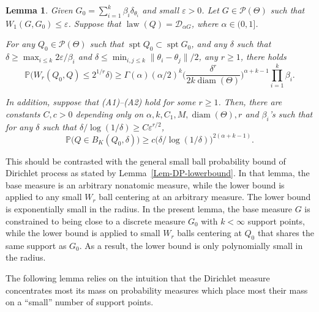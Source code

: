 \documentclass[MSNbibl,number,citesort]{arxbj}
\newtheorem{lemma}{Lemma}[section]
\newcommand{\Pcal}{\mathscr{P}}
\newcommand{\Prob}{\mathbb{P}}
\newcommand{\supp}{\operatorname{spt}}
\newcommand{\DP}{\mathscr{D}}
\newcommand{\law}{\operatorname{law}}
\newcommand{\Wr}{W_r}
\begin{document}
%
\begin{lemma}
\label{Lem-DP-concent}
Given $G_0 = \sum_{i=1}^{k}\beta_i \delta_{\theta_{i}}$ and small
$\varepsilon> 0$.
Let $G \in\Pcal(\Theta)$ such that $W_1(G,G_0) \leq\varepsilon$.
Suppose that $\law(Q) = \DP_{\alpha G}$, where $\alpha\in(0,1]$.
%
\begin{longlist}[(a)]
%
\item[(a)] For any $Q_0 \in\Pcal(\Theta)$ such that $\supp Q_0
\subset\supp G_0$,
and any $\delta$ such that $\delta\geq\max_{i\leq k} 2\varepsilon
/\beta
_i$ and
$\delta\leq\min_{i,j\leq k} \|\theta_i-\theta_j\|/2$, any $r\geq1$,
there holds
%
\[
\Prob \bigl(\Wr(Q_0,Q) \leq2^{1/r}\delta \bigr) \geq\Gamma(
\alpha) (\alpha/2)^k \biggl(\frac{\delta^r}{2k \operatorname
{diam}(\Theta)} \biggr)^{\alpha+ k-1}
\prod_{i=1}^{k}\beta_i.
\]

\item[(b)] In addition, suppose that \textup{(A1)--(A2)} hold for some $r \geq1$.
Then, there are constants $C, c>0$ depending only on $\alpha, k, C_1,
M, \operatorname{diam}(\Theta), r$
and $\beta_i$'s such that
for any $\delta$ such that $\delta/\log(1/\delta) \geq C\varepsilon^{r/2}$,
%
\[
\Prob \bigl(Q \in B_K(Q_0, \delta) \bigr) \geq c
\bigl( \delta/\log(1/\delta) \bigr)^{2(\alpha+k-1)}.
\]
%
\end{longlist}
%
\end{lemma}

This should be contrasted with the general small ball probability bound
of Dirichlet process as stated by Lemma~\ref{Lem-DP-lowerbound}. In that
lemma, the base measure is an arbitrary nonatomic measure, while the lower
bound is applied to any small $\Wr$ ball centering at an arbitrary measure.
The lower bound is exponentially small in the radius.
In the present lemma, the base measure $G$ is constrained
to being close to a discrete measure $G_0$ with $k <\infty$ support
points, while
the lower bound is applied to small $\Wr$ balls centering at $Q_0$
that shares
the same support as $G_0$. As a result, the lower bound is only
polynomially small
in the radius.

The following lemma relies on the intuition that
the Dirichlet measure concentrates most
its mass on probability measures which place most their mass
on a ``small'' number of support points.
\end{document}
